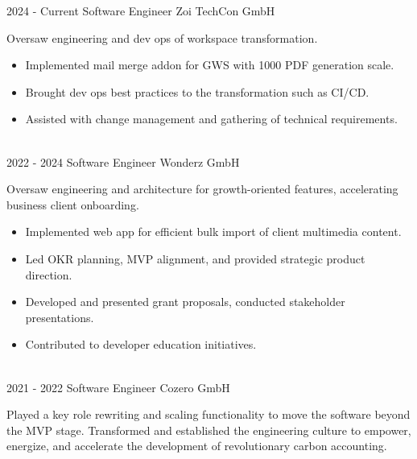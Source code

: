 \vspace{-10 pt}
\begin{entrylist}
	\entry
        {2024 - Current}
		{Software Engineer}
		{Zoi TechCon GmbH}
		{
      Oversaw engineering and dev ops of workspace transformation.

        
      \vspace{10pt}
        \begin{itemize}[noitemsep,topsep=0pt,parsep=0pt,partopsep=0pt, leftmargin=-1pt]
            \item Implemented mail merge addon for GWS with 1000 PDF generation scale.
            \item Brought dev ops best practices to the transformation such as CI/CD.
            \item Assisted with change management and gathering of technical requirements.
        \end{itemize}
        }\\
	\entry
        {2022 - 2024}
		{Software Engineer}
		{Wonderz GmbH}
		{
      Oversaw engineering and architecture for growth-oriented features, accelerating business client onboarding.

        
      \vspace{10pt}
        \begin{itemize}[noitemsep,topsep=0pt,parsep=0pt,partopsep=0pt, leftmargin=-1pt]
            \item Implemented web app for efficient bulk import of client multimedia content.
            \item Led OKR planning, MVP alignment, and provided strategic product direction.
            \item Developed and presented grant proposals, conducted stakeholder presentations.
            \item Contributed to developer education initiatives.
        \end{itemize}
        }\\
	\entry
		{2021 - 2022}
		{Software Engineer}
		{Cozero GmbH}
		{
Played a key role rewriting and scaling functionality to move the software beyond the MVP stage.
Transformed and established the engineering culture to empower, energize, and accelerate the
development of revolutionary carbon accounting.
      \vspace{10pt}

}
\end{entrylist}
